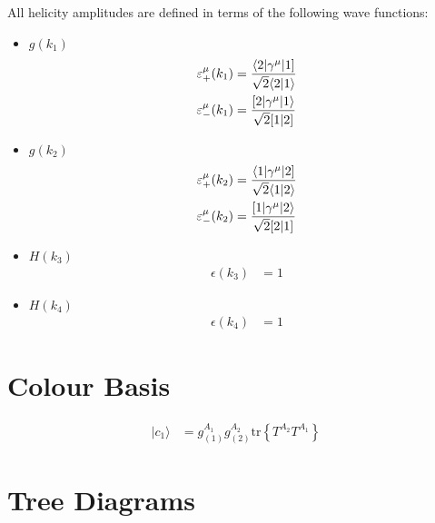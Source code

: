 \documentclass[a4paper]{article}
\newcommand{\Spaa}[1]{\langle #1 \rangle}
\newcommand{\Spab}[1]{\langle #1]}
\newcommand{\Spba}[1]{[ #1 \rangle}
\newcommand{\Spbb}[1]{[ #1 ]}
\begin{document}
All helicity amplitudes are defined in terms of the following wave functions:
\begin{itemize}
\item $g(k_{1})$ 
\begin{align}
\varepsilon^\mu_+(k_{1}) &=
   \frac{\Spab{2\vert\gamma^\mu\vert 1}}{%
   \sqrt{2}\Spaa{2\vert 1}}\\
\varepsilon^\mu_-(k_{1}) &=
   \frac{\Spba{2\vert\gamma^\mu\vert 1}}{%
   \sqrt{2}\Spbb{1\vert 2}}
\end{align}
\item $g(k_{2})$ 
\begin{align}
\varepsilon^\mu_+(k_{2}) &=
   \frac{\Spab{1\vert\gamma^\mu\vert 2}}{%
   \sqrt{2}\Spaa{1\vert 2}}\\
\varepsilon^\mu_-(k_{2}) &=
   \frac{\Spba{1\vert\gamma^\mu\vert 2}}{%
   \sqrt{2}\Spbb{2\vert 1}}
\end{align}
\item $H(k_3)$ 
\begin{align}
\epsilon(k_{3}) &= 1
\end{align}
\item $H(k_4)$ 
\begin{align}
\epsilon(k_{4}) &= 1
\end{align}
\end{itemize}

\section{Colour Basis}
\begin{align}
\vert c_{1}\rangle &=g^{A_{1}}_{(1)}g^{A_{2}}_{(2)}\textrm{tr}\left\{T^{A_{2}}T^{A_{1}}\right\}
\end{align}


\section{Tree Diagrams}

\end{document}
